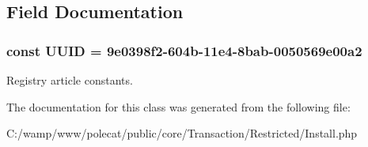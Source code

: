 \subsection{Field Documentation}
\hypertarget{class_able_polecat___transaction___restricted___install_a74b892c8c0b86bf9d04c5819898c51e7}{}
\subsubsection[{U\+U\+I\+D}]{\setlength{\rightskip}{0pt plus 5cm}const U\+U\+I\+D = \textquotesingle{}9e0398f2-\/604b-\/11e4-\/8bab-\/0050569e00a2\textquotesingle{}}\label{class_able_polecat___transaction___restricted___install_a74b892c8c0b86bf9d04c5819898c51e7}
Registry article constants. 

The documentation for this class was generated from the following file\+:\begin{DoxyCompactItemize}
\item 
C\+:/wamp/www/polecat/public/core/\+Transaction/\+Restricted/Install.\+php\end{DoxyCompactItemize}
